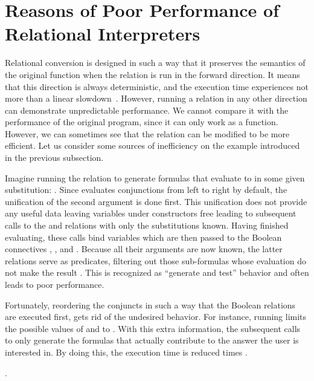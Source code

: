 \section{Reasons of Poor Performance of Relational Interpreters}

Relational conversion is designed in such a way that it preserves the semantics of the original function when the relation is run in the forward direction. 
It means that this direction is always deterministic, and the execution time experiences not more than a linear slowdown~\cite{lozov2022automated}.
However, running a relation in any other direction can demonstrate unpredictable performance. 
We cannot compare it with the performance of the original program, since it can only work as a function. 
However, we can sometimes see that the relation can be modified to be more efficient. 
Let us consider some sources of inefficiency on the example introduced in the previous subsection. 

Imagine running the relation to generate formulas that evaluate to  in some given substitution: . 
Since \mk evaluates conjunctions from left to right by default, the unification of the second argument  is done first. 
This unification does not provide any useful data leaving variables under constructors free leading to subsequent calls to the  and  relations with only the substitutions known. 
Having finished evaluating, these calls bind variables which are then passed to the Boolean connectives , , and . 
Because all their arguments are now known, the latter relations serve as predicates, filtering out those sub-formulas whose evaluation do not make the result . 
This is recognized as ``generate and test'' behavior and often leads to poor performance. 

Fortunately, reordering the conjuncts in such a way that the Boolean relations are executed first, gets rid of the undesired behavior. 
For instance, running  limits the possible values of  and  to . 
With this extra information, the subsequent calls to  only generate the formulas that actually contribute to the answer the user is interested in. 
By doing this, the execution time is reduced  times . 

. 

